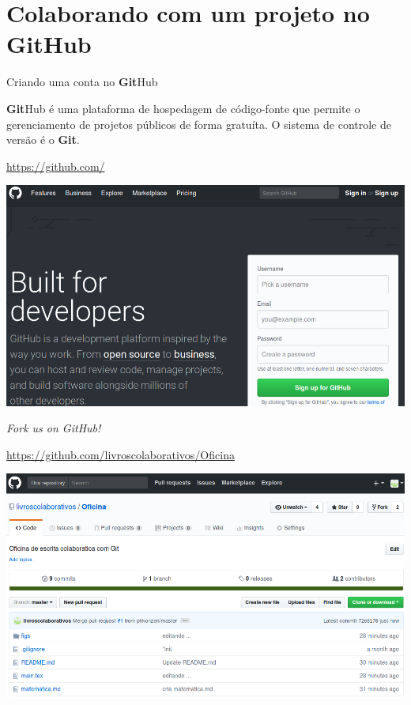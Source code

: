 \documentclass{beamer}
\begin{document}
\section{Colaborando com um projeto no {\bf Git}Hub}

\begin{frame}{Criando uma conta no {\bf Git}Hub}
  \begin{center}
    {\bf Git}Hub é uma plataforma de hospedagem de código-fonte que permite o gerenciamento de projetos públicos de forma gratuíta. O sistema de controle de versão é o {\bf Git}.
  \end{center}
  \begin{center}
    \url{https://github.com/}
    
    \includegraphics[scale=0.25]{./figs/SignUp_GitHub.png}
  \end{center}
\end{frame}

\begin{frame}{{\it Fork us on GitHub!}}
  \begin{center}
    \url{https://github.com/livroscolaborativos/Oficina}

    \includegraphics[scale=0.3]{./figs/Fork_us_on_GitHub.png}
  \end{center}
\end{frame}
\end{document}

